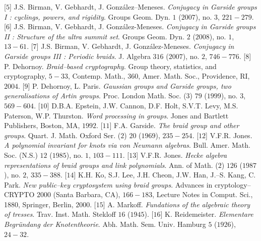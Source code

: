 \begin{multicols}{2}
	\vskip 0.1cm
	[$5$] J.S. Birman, V. Gebhardt, J. González--Meneses. \textit{Conjugacy in Garside groups I : cyclings, powers, and rigidity}. Groups Geom. Dyn. $1$ ($2007$), no. $3$, $221-279$.
	\vskip 0.1cm
	[$6$] J.S. Birman, V. Gebhardt, J. González-Meneses. \textit{Conjugacy in Garside groups II : Structure of the ultra summit set}. Groups Geom. Dyn. $2$ ($2008$), no. $1$, $13-61$.
	\vskip 0.1cm
	[$7$] J.S. Birman, V. Gebhardt, J. González-Meneses. \textit{Conjugacy in Garside groups III : Periodic braids}. J. Algebra $316$ ($2007$), no. $2$, $746-776$.
	\vskip 0.1cm
	[$8$] P. Dehornoy. \textit{Braid--based cryptography}. Group theory, statistics, and cryptography, $5-33$, Contemp. Math., $360$, Amer. Math. Soc., Providence, RI, $2004$.
	\vskip 0.1cm
	[$9$] P. Dehornoy, L. Paris. \textit{Gaussian groups and Garside groups, two generalisations of Artin groups}. Proc. London Math. Soc. ($3$) $79$ ($1999$), no. $3$, $569-604$.
	\vskip 0.1cm
	[$10$] D.B.A. Epstein, J.W. Cannon, D.F. Holt, S.V.T. Levy, M.S. Paterson, W.P. Thurston. \textit{Word processing in groups}. Jones and Bartlett Publishers, Boston, MA, $1992$.
	\vskip 0.1cm
	[$11$] F.A. Garside. \textit{The braid group and other groups}. Quart. J. Math. Oxford Ser. ($2$) $20$ ($1969$), $235-254$.
	\vskip 0.1cm
	[$12$] V.F.R. Jones. \textit{A polynomial invariant for knots via von Neumann algebras}. Bull. Amer. Math. Soc. (N.S.) $12$ ($1985$), no. $1$, $103-111$.
	\vskip 0.1cm
	[$13$] V.F.R. Jones. \textit{Hecke algebra representations of braid groups and link polynomials}. Ann. of Math. ($2$) $126$ ($1987$), no. $2$, $335-388$.
	\vskip 0.1cm
	[$14$] K.H. Ko, S.J. Lee, J.H. Cheon, J.W. Han, J.--S. Kang, C. Park. \textit{New public--key cryptosystem using braid groups}. Advances in cryptology--CRYPTO $2000$ (Santa Barbara, CA), $166-183$, Lecture Notes in Comput. Sci., 1880, Springer, Berlin, $2000$.
	\vskip 0.1cm
	[$15$] A. Markoff. \textit{Fundations of the algebraic theory of tresses}. Trav. Inst. Math. Stekloff $16$ ($1945$).
	\vskip 0.1cm
	[$16$] K. Reidemeister. \textit{Elementare Begründang der Knotentheorie}. Abh. Math. Sem. Univ. Hamburg $5$ ($1926$), $24-32$.
\end{multicols}

\begin{center}
	
\end{center}